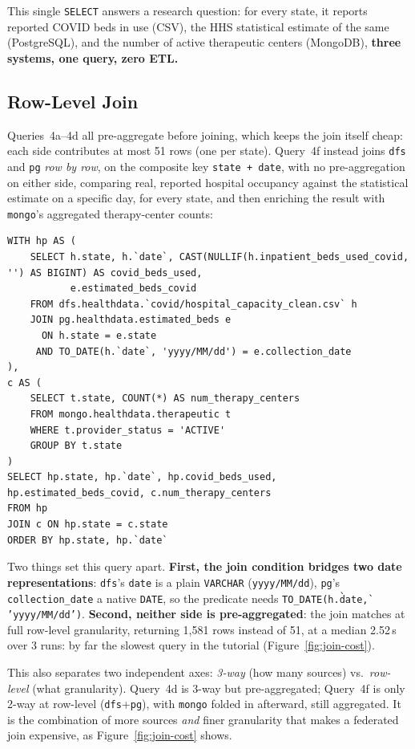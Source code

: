 \documentclass[11pt,a4paper]{article}
\begin{document}
This single \texttt{SELECT} answers a research question: for every state, it reports reported COVID beds in
use (CSV), the HHS statistical estimate of the same (PostgreSQL), and the number of
active therapeutic centers (MongoDB), \textbf{three systems, one query, zero ETL.}

\subsection{Row-Level Join}
Queries~4a--4d all pre-aggregate before joining, which keeps the join itself cheap:
each side contributes at most 51 rows (one per state). Query~4f instead joins
\texttt{dfs} and \texttt{pg} \emph{row by row}, on the composite key
\texttt{state~+~date}, with no pre-aggregation on either side, comparing real,
reported hospital occupancy against the statistical estimate on a specific day, for
every state, and then enriching the result with \texttt{mongo}'s aggregated
therapy-center counts:

\begin{lstlisting}[style=sqlstyle, caption={Q4f -- dfs + pg row-level join (on state + date), enriched with mongo.}]
WITH hp AS (
    SELECT h.state, h.`date`, CAST(NULLIF(h.inpatient_beds_used_covid, '') AS BIGINT) AS covid_beds_used,
           e.estimated_beds_covid
    FROM dfs.healthdata.`covid/hospital_capacity_clean.csv` h
    JOIN pg.healthdata.estimated_beds e
      ON h.state = e.state
     AND TO_DATE(h.`date`, 'yyyy/MM/dd') = e.collection_date
),
c AS (
    SELECT t.state, COUNT(*) AS num_therapy_centers
    FROM mongo.healthdata.therapeutic t
    WHERE t.provider_status = 'ACTIVE'
    GROUP BY t.state
)
SELECT hp.state, hp.`date`, hp.covid_beds_used, hp.estimated_beds_covid, c.num_therapy_centers
FROM hp
JOIN c ON hp.state = c.state
ORDER BY hp.state, hp.`date`
\end{lstlisting}

Two things set this query apart. \textbf{First, the join condition bridges two date
representations}: \texttt{dfs}'s \texttt{date} is a plain \texttt{VARCHAR}
(\texttt{yyyy/MM/dd}), \texttt{pg}'s \texttt{collection\_date} a native \texttt{DATE},
so the predicate needs \texttt{TO\_DATE(h.\`date\`, 'yyyy/MM/dd')}. \textbf{Second, neither side is
pre-aggregated}: the join matches at full row-level granularity, returning
1{,}581 rows instead of 51, at a median 2.52\,s over 3 runs: by far the slowest
query in the tutorial (Figure~\ref{fig:join-cost}). 

This also separates two
independent axes: \emph{3-way} (how many sources) vs.\ \emph{row-level} (what
granularity). Query~4d is 3-way but pre-aggregated; Query~4f is only 2-way at
row-level (\texttt{dfs}+\texttt{pg}), with \texttt{mongo} folded in afterward, still
aggregated. It is the combination of more sources \emph{and} finer granularity that
makes a federated join expensive, as Figure~\ref{fig:join-cost} shows.
\end{document}
